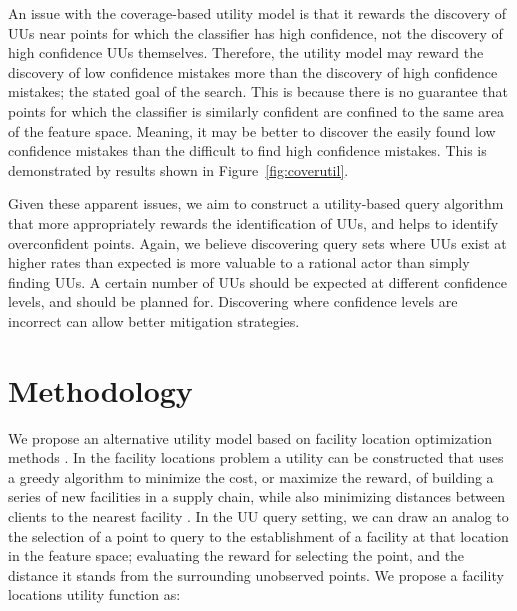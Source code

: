 \documentclass[10pt, conference]{IEEEtran}
\begin{document}
An issue with the coverage-based utility model is that it rewards the discovery of UUs near points for which the classifier has high confidence, not the discovery of high confidence UUs themselves.  Therefore, the utility model may reward the discovery of low confidence mistakes more than the discovery of high confidence mistakes; the stated goal of the search. This is because there is no guarantee that points for which the classifier is similarly confident are confined to the same area of the feature space.  Meaning, it may be better to discover the easily found low confidence mistakes than the difficult to find high confidence mistakes. This is demonstrated by results shown in Figure~\ref{fig:coverutil}. 

Given these apparent issues, we aim to construct a utility-based query algorithm that more appropriately rewards the identification of UUs, and helps to identify overconfident points. Again, we believe discovering query sets where UUs exist at higher rates than expected is more valuable to a rational actor than simply finding UUs.  A certain number of UUs should be expected at different confidence levels, and should be planned for.  Discovering where confidence levels are incorrect can allow better mitigation strategies. 

\section{Methodology}

We propose an alternative utility model based on facility location optimization methods  \cite{farahani2009facility}. In the facility locations problem a utility can be constructed that uses a greedy algorithm to minimize the cost, or maximize the reward, of building a series of new facilities in a supply chain, while also minimizing distances between clients to the nearest facility  \cite{guha1999greedy} \cite{arya2004local}. In the UU query setting, we can draw an analog to the selection of a point to query to the establishment of a facility at that location in the feature space; evaluating the reward for selecting the point, and the distance it stands from the surrounding unobserved points. We propose a facility locations utility function as: 
\end{document}
